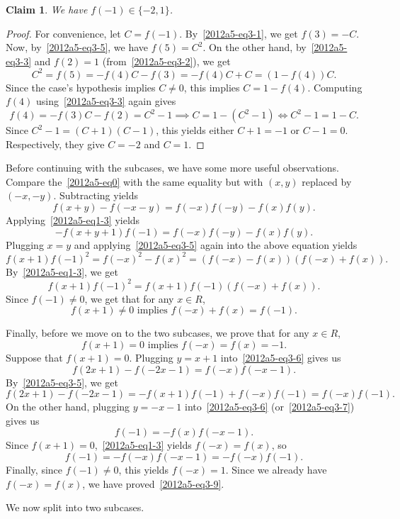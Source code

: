 \documentclass{article}
\newtheorem*{claim}{Claim}
\begin{document}
\begin{claim}
We have $f(-1) \in \{-2, 1\}$.
\end{claim}
\begin{proof}
For convenience, let $C = f(-1)$.
By~\eqref{2012a5-eq3-1}, we get $f(3) = -C$.
Now, by~\eqref{2012a5-eq3-5}, we have $f(5) = C^2$.
On the other hand, by~\eqref{2012a5-eq3-3} and $f(2) = 1$ (from~\eqref{2012a5-eq3-2}), we get
\[ C^2 = f(5) = -f(4) C - f(3) = -f(4) C + C = (1 - f(4)) C. \]
Since the case's hypothesis implies $C \neq 0$, this implies $C = 1 - f(4)$.
Computing $f(4)$ using~\eqref{2012a5-eq3-3} again gives
\[ f(4) = -f(3) C - f(2) = C^2 - 1 \implies C = 1 - (C^2 - 1) \iff C^2 - 1 = 1 - C. \]
Since $C^2 - 1 = (C + 1)(C - 1)$, this yields either $C + 1 = -1$ or $C - 1 = 0$.
Respectively, they give $C = -2$ and $C = 1$.
\end{proof}

Before continuing with the subcases, we have some more useful observations.
Compare the~\eqref{2012a5-eq0} with the same equality but with $(x, y)$ replaced by $(-x, -y)$.
Subtracting yields
\[ f(x + y) - f(-x - y) = f(-x) f(-y) - f(x) f(y). \tag{3.6}\label{2012a5-eq3-6} \]
Applying~\eqref{2012a5-eq1-3} yields
\[ -f(x + y + 1) f(-1) = f(-x) f(-y) - f(x) f(y). \tag{3.7}\label{2012a5-eq3-7} \]
Plugging $x = y$ and applying~\eqref{2012a5-eq3-5} again into the above equation yields
\[ f(x + 1) f(-1)^2 = f(-x)^2 - f(x)^2 = (f(-x) - f(x)) (f(-x) + f(x)). \]
By~\eqref{2012a5-eq1-3}, we get
\[ f(x + 1) f(-1)^2 = f(x + 1) f(-1) (f(-x) + f(x)). \]
Since $f(-1) \neq 0$, we get that for any $x \in R$,
\[ f(x + 1) \neq 0 \text{ implies } f(-x) + f(x) = f(-1). \tag{3.8}\label{2012a5-eq3-8} \]

Finally, before we move on to the two subcases, we prove that for any $x \in R$,
\[ f(x + 1) = 0 \text{ implies } f(-x) = f(x) = -1. \tag{3.9}\label{2012a5-eq3-9} \]
Suppose that $f(x + 1) = 0$.
Plugging $y = x + 1$ into~\eqref{2012a5-eq3-6} gives us
\[ f(2x + 1) - f(-2x - 1) = f(-x) f(-x - 1). \]
By~\eqref{2012a5-eq3-5}, we get
\[ f(2x + 1) - f(-2x - 1) = -f(x + 1) f(-1) + f(-x) f(-1) = f(-x) f(-1). \]
On the other hand, plugging $y = -x - 1$ into~\eqref{2012a5-eq3-6} (or~\eqref{2012a5-eq3-7}) gives us
\[ f(-1) = -f(x) f(-x - 1). \]
Since $f(x + 1) = 0$,~\eqref{2012a5-eq1-3} yields $f(-x) = f(x)$, so
\[ f(-1) = -f(-x) f(-x - 1) = -f(-x) f(-1). \]
Finally, since $f(-1) \neq 0$, this yields $f(-x) = 1$.
Since we already have $f(-x) = f(x)$, we have proved~\eqref{2012a5-eq3-9}.

We now split into two subcases.
\end{document}
